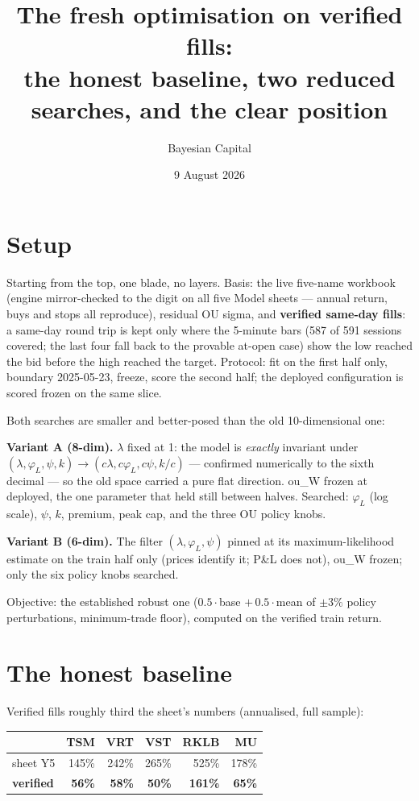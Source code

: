 \documentclass[11pt,a4paper]{article}
\title{The fresh optimisation on verified fills:\\
\large the honest baseline, two reduced searches, and the clear position}
\author{Bayesian Capital}
\date{9 August 2026}
\begin{document}
\maketitle

\section*{Setup}

Starting from the top, one blade, no layers. Basis: the live five-name workbook
(engine mirror-checked to the digit on all five Model sheets --- annual return, buys
and stops all reproduce), residual OU sigma, and \textbf{verified same-day fills}: a
same-day round trip is kept only where the 5-minute bars (587 of 591 sessions
covered; the last four fall back to the provable at-open case) show the low reached
the bid before the high reached the target. Protocol: fit on the first half only,
boundary 2025-05-23, freeze, score the second half; the deployed configuration is
scored frozen on the same slice.

Both searches are smaller and better-posed than the old 10-dimensional one:

\textbf{Variant A (8-dim).} $\lambda$ fixed at 1: the model is \emph{exactly}
invariant under $(\lambda,\varphi_L,\psi,k) \to (c\lambda,c\varphi_L,c\psi,k/c)$ ---
confirmed numerically to the sixth decimal --- so the old space carried a pure flat
direction. ou\_W frozen at deployed, the one parameter that held still between
halves. Searched: $\varphi_L$ (log scale), $\psi$, $k$, premium, peak cap, and the
three OU policy knobs.

\textbf{Variant B (6-dim).} The filter $(\lambda,\varphi_L,\psi)$ pinned at its
maximum-likelihood estimate on the train half only (prices identify it; P\&L does
not), ou\_W frozen; only the six policy knobs searched.

Objective: the established robust one ($0.5\cdot$base $+\,0.5\cdot$mean of $\pm3\%$
policy perturbations, minimum-trade floor), computed on the verified train return.

\section*{The honest baseline}

Verified fills roughly third the sheet's numbers (annualised, full sample):

\begin{center}
\begin{tabular}{lrrrrr}
\toprule
 & TSM & VRT & VST & RKLB & MU \\
\midrule
sheet Y5            & 145\% & 242\% & 265\% & 525\% & 178\% \\
\textbf{verified}   & \textbf{56\%} & \textbf{58\%} & \textbf{50\%} & \textbf{161\%} & \textbf{65\%} \\
\bottomrule
\end{tabular}
\end{center}
\end{document}
